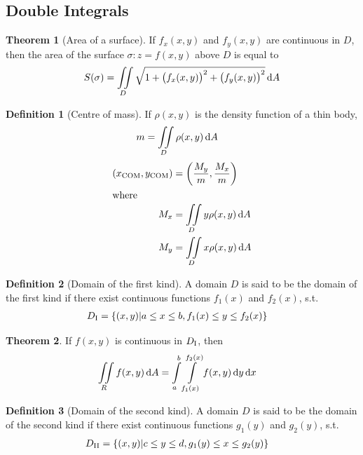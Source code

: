 \documentclass[fleqn, a4paper, 10pt]{article}
\theoremstyle{definition}
\newtheorem{definition}{Definition}
\theoremstyle{theorem}
\newtheorem{theorem}{Theorem}
\theoremstyle{remark}
\begin{document}
\begin{multicols}{2}
\section{Double Integrals}

\begin{theorem}[Area of a surface]
	If $f_x(x,y)$ and $f_y(x,y)$ are continuous in $D$, then the area of the surface $\sigma : z = f(x,y)$ above $D$ is equal to 
	\begin{equation*}
		S(\sigma) = \iint\limits_{D} \sqrt{1 + \left( f_x(x,y) \right)^2 + \left( f_y(x,y) \right)^2} \dif A
	\end{equation*}
\end{theorem}

\begin{definition}[Centre of mass]
	If $\rho(x,y)$ is the density function of a thin body,
	\begin{align*}
		m &= \iint\limits_{D} \rho(x,y) \dif A
	\end{align*}
	\begin{align*}
		(x_{\text{COM}}, y_{\text{COM}}) &= \left( \dfrac{M_y}{m}, \dfrac{M_x}{m} \right)\\
		\intertext{where}
		M_x &= \iint\limits_{D} y \rho(x,y) \dif A\\
		M_y &= \iint\limits_{D} x \rho(x,y) \dif A\\
	\end{align*}
\end{definition}

\begin{definition}[Domain of the first kind]
	A domain $D$ is said to be the domain of the first kind if there exist continuous functions $f_1(x)$ and $f_2(x)$, s.t.
	\begin{align*}
	D_{\textnormal{I}} &= \{(x,y) | a \leq x \leq b, f_1(x) \leq y \leq f_2(x)\}
	\end{align*}
\end{definition}

\begin{theorem}
	If $f(x,y)$ is continuous in $D_{\textnormal{I}}$, then
	\begin{align*}
		\iint\limits_{R} f(x,y) \dif A &= \int\limits_{a}^{b} \int\limits_{f_1(x)}^{f_2(x)} f(x,y) \dif y \dif x
	\end{align*}
\end{theorem}

\begin{definition}[Domain of the second kind]
	A domain $D$ is said to be the domain of the second kind if there exist continuous functions $g_1(y)$ and $g_2(y)$, s.t.
	\begin{align*}
		D_{\textnormal{II}} &= \{(x,y) | c \leq y \leq d, g_1(y) \leq x \leq g_2(y)\}
	\end{align*}
\end{definition}


\end{multicols}
\end{document}
